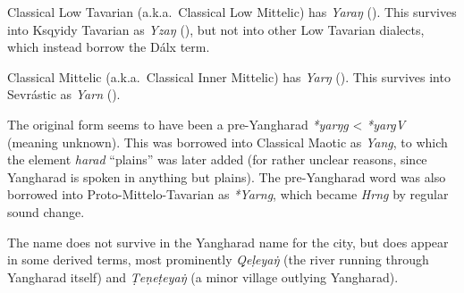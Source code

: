 \documentclass{article}
\begin{document}
\begin{itemize}
Classical Low Tavarian (a.k.a.\ Classical Low Mittelic) has \textit{Yaraŋ} (). This survives into Ksqyidy Tavarian as \textit{Yzaŋ} (), but not into other Low Tavarian dialects, which instead borrow the Dálx term.

Classical Mittelic (a.k.a.\ Classical Inner Mittelic) has \textit{Yarŋ} (). This survives into Sevrástic as \textit{Yarn} ().

 The original form seems to have been a pre-Yangharad \textit{*yarŋg} < \textit{*yargV} (meaning unknown). This was borrowed into Classical Maotic as \textit{Yang}, to which the element \textit{harad} ``plains'' was later added (for rather unclear reasons, since Yangharad is spoken in anything but plains). The pre-Yang\-harad word was also borrowed into Proto-Mittelo-Tavarian as \textit{*Yarng}, which became \textit{Hrng} by regular sound change.

 The name does not survive in the Yangharad name for the city, but does appear in some derived terms, most prominently \textit{\d{Q}e\d{l}eya\.{ŋ}} (the river running through Yangharad itself) and \textit{\d{T}e\d{n}e\d{t}eya\.{ŋ}} (a minor village outlying Yangharad).

\end{itemize}
\end{document}
